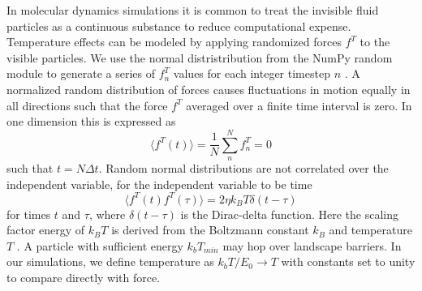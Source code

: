 \documentclass[twocolumn,preprintnumbers,amsmath,amssymb,aps,prx]{revtex4}
\begin{document}
  In molecular dynamics simulations
  it is common to treat the 
  invisible fluid particles as a continuous substance
  to reduce computational expense.
  Temperature effects
  can be modeled by applying randomized forces $f^T$
  to the visible particles.
  We use the normal distristribution from the NumPy random module
  to generate a series of $f^T_n$ values for
  each integer timestep $n$ \cite{numpy}.
  A normalized random distribution of forces
  causes fluctuations in %
  motion 
  equally in all
  directions such that the force $f^T$
  averaged over a finite time interval
  is zero.  In one dimension this is expressed as 
  \begin{equation}
    \langle f^T(t) \rangle = \frac{1}{N} \sum_n^N f^T_n = 0
  \end{equation}
  such that $t = N \Delta t$.
  Random normal distributions are not correlated 
  over the independent variable,
  for the independent variable to be time
  \begin{equation}
  \langle f^T(t) f^T(\tau)\rangle = 2 \eta k_B T \delta(t-\tau)
  \end{equation}
  for times $t$ and $\tau$,
  where $\delta(t-\tau)$ is the Dirac-delta function.
  Here the scaling factor energy of 
  $k_B T$ is
  derived from the Boltzmann constant $k_B$
  and temperature $T$ \cite{Allen2017}.
  A particle
  with sufficient energy $k_b T_{min}$ may 
  hop over landscape
  barriers.
  In our simulations,
  we define temperature as 
  $k_b T/E_0 \rightarrow T$
  with constants set to unity
  to
  compare directly with force. 
\end{document}
